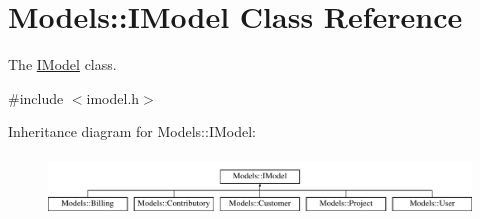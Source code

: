 \hypertarget{classModels_1_1IModel}{\section{Models\-:\-:I\-Model Class Reference}
\label{classModels_1_1IModel}
}


The \hyperlink{classModels_1_1IModel}{I\-Model} class.  




{\ttfamily \#include $<$imodel.\-h$>$}

Inheritance diagram for Models\-:\-:I\-Model\-:\begin{figure}[H]
\begin{center}
\leavevmode
\includegraphics[height=1.635036cm]{d0/d9c/classModels_1_1IModel}
\end{center}
\end{figure}

